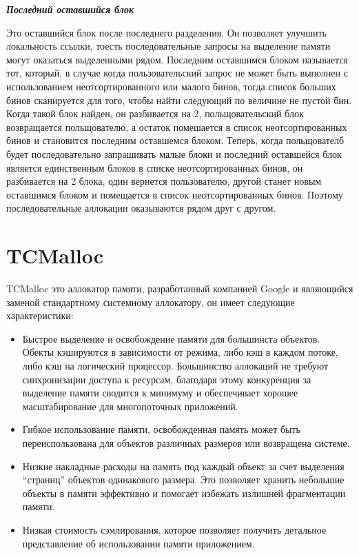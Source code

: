 \textit{\textbf{Последний оставшийся блок}}

Это оставшийся блок после последнего разделения. Он позволяет улучшить локальность ссылки, тоесть последовательные запросы на выделение памяти могут оказаться выделенными рядом. Последним оставшимся блоком называется тот, который, в случае когда пользовательский запрос не может быть выполнен с использованием неотсортированного или малого бинов, тогда список больших бинов сканируется для того, чтобы найти следующий по величине не пустой бин. Когда такой блок найден, он разбивается на 2, польщовательский блок возвращается польщователю, а остаток помешается в список неотсортированных бинов и становится последним оставшемся блоком. Теперь, когда польщователб будет последовательно запрашивать малые блоки и последний оставшейся блок является единственным блоков в списке неотсортированных бинов, он разбивается на 2 блока, один вернется пользователю, другой станет новым оставшимся блоком и помещается в список неотсортированных бинов. Поэтому последовательные аллокации оказываются рядом друг с другом.

\section{TCMalloc}
TCMalloc\cite{tcmalloc-design-doc} это аллокатор памяти, разработанный компанией Google и являющийся заменой стандартному системному аллокатору, он имеет следующие характеристики:
\begin{itemize}
	\item Быстрое выделение и освобождение памяти для большинста объектов. Обекты кэшируются в зависимости от режима, либо кэш в каждом потоке, либо кэш на логический процессор. Большинство аллокаций не требуют синхронизации доступа к ресурсам, благодаря этому конкуренция за выделение памяти сводится к минимуму и обеспечивает хорошее масштабирование для многопоточных приложений.
	\item Гибкое использование памяти, освобожденная память может быть переиспользована для объектов различных размеров или возвращена системе.
	\item Низкие накладные расходы на память под каждый объект за счет выделения ``страниц'' объектов одинакового размера. Это позволяет хранить небольшие объекты в памяти эффективно и помогает избежать излишней фрагментации памяти.
	\item Низкая стоимость сэмлирования, которое позволяет получить детальное представление об использовании памяти приложением.
\end{itemize}

